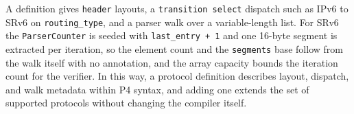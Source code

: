 A definition gives \texttt{header} layouts, a \texttt{transition
select} dispatch such as IPv6 to SRv6 on \texttt{routing\_type}, and a
parser walk over a variable-length list. For SRv6 the
\texttt{ParserCounter} is seeded with \texttt{last\_entry + 1} and one
16-byte segment is extracted per iteration, so the element count and
the \texttt{segments} base follow from the walk itself with no \kunai
annotation, and the array capacity bounds the iteration count for the
verifier. In this way, a protocol definition describes layout,
dispatch, and walk metadata within P4 syntax, and adding one extends
the set of supported protocols without changing the compiler itself.
